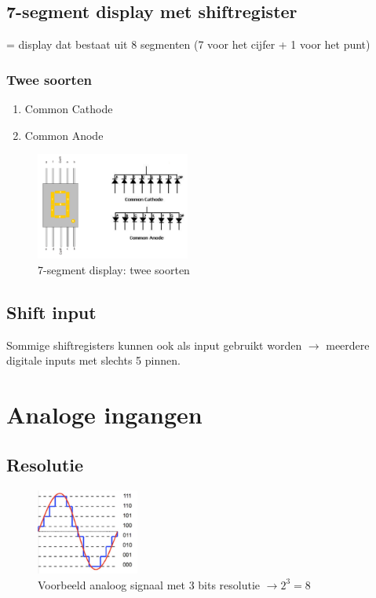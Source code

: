 \documentclass{article}
\begin{document}
\subsection{7-segment display met shiftregister}
= display dat bestaat uit 8 segmenten (7 voor het cijfer + 1 voor het punt)

\subsubsection{Twee soorten}
\begin{enumerate}
    \item Common Cathode
    \item Common Anode
\end{enumerate}

\begin{figure}[H]
    \centering
    \includegraphics[width=0.45\textwidth]{7-display.png}
    \caption{7-segment display: twee soorten}
\end{figure}

\subsection{Shift input}
Sommige shiftregisters kunnen ook als input gebruikt worden $\rightarrow$ meerdere digitale inputs met slechts 5 pinnen.


\section{Analoge ingangen}
\subsection{Resolutie}

\begin{figure}[H]
    \centering
    \includegraphics[width=0.3\textwidth]{analoge-ingangen.png}
    \caption{Voorbeeld analoog signaal met 3 bits resolutie $\rightarrow 2^3 = 8$}
\end{figure}
\end{document}
